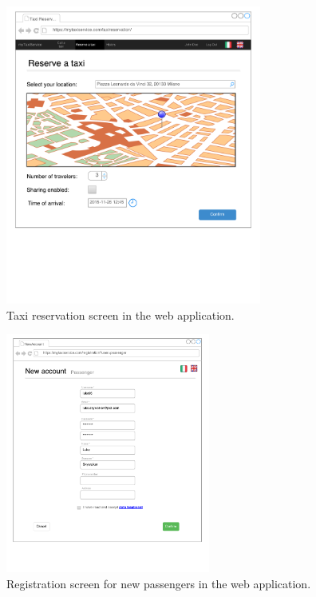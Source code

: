 \begin{figure}[h]
\centering
\includegraphics[width=0.75\textwidth]{mockup/web/TaxiReservationBrowser}
\caption{Taxi reservation screen in the web application.}
\label{fig:mockup-reservation-browser}
\end{figure}

\begin{figure}[h]
\centering
\includegraphics[width=0.6\textwidth]{mockup/web/Registration}
\caption{Registration screen for new passengers in the web application.}
\label{fig:mockup-registration}
\end{figure}

